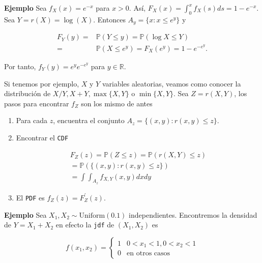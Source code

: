 \documentclass{article}\usepackage[]{graphicx}\usepackage[]{color}
\begin{document}
\vspace{0.5cm}

\textbf{Ejemplo} Sea $f_{X}(x) = e^{-x}$ para $x > 0$. As\'i, $F_{X}(x) = \int_{0}^{x}f_{X}(s)ds = 1 -e^{-x}$. Sea $Y = r(X) = \log(X)$. Entonces $A_y = \{x: x\leq e^{y} \}$ y

\begin{align*}
F_{Y}(y) = &\mathbb{P}(Y\leq y) = \mathbb{P}(\log X \leq Y)\\
= & \mathbb{P}(X \leq e^y) = F_{X}(e^y) =  1- e^{-e^{y}}.
\end{align*}

\vspace{0.3cm}

Por tanto, $f_{Y}(y) = e^ye^{-e^{y}}$ para $y \in \mathbb{R}$.


\vspace{0.5cm}

Si tenemos por ejemplo, $X$ y $Y$ variables aleatorias, veamos como conocer la distribuci\'on de $X/Y, X +Y, \max\{X,Y \} $ o $\min\{X,Y \}$. Sea $Z = r(X,Y)$, los pasos para encontrar $f_{Z}$ son los mismo de antes

\begin{enumerate}
\item Para cada $z$, encuentra el conjunto $A_z =  \{(x,y): r(x,y) \leq z \}$.
\item Encontrar el \texttt{CDF}

\begin{align*}
F_{Z}(z) = \mathbb{P}(Z \leq z) = \mathbb{P}(r(X,Y) \leq z)\\
   = \mathbb{P}(\{(x,y) : r(x,y) \leq z \})\\
   = \int \int_{A_z}f_{X,Y}(x,y)dxdy 
\end{align*}
\item El \texttt{PDF} es $f_{Z}(z) = F_{Z}^{'}(z)$.
\end{enumerate}

\vspace{0.3cm}

\textbf{Ejemplo} Sea $X_1, X_2 \sim \mbox{Uniform}(0.1)$ independientes. Encontremos la densidad de $Y = X_1 + X_2$ en efecto la  \texttt{jdf} de $(X_1,X_2)$ es

\vspace{0.2cm}

\[
f(x_1, x_2) = \begin{cases}
1 & 0< x_1 < 1, 0 < x_2 < 1\\
0 & \mbox{en otros casos}
\end{cases}
\]
\end{document}
